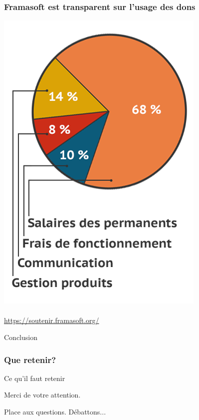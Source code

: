 \documentclass{beamer}
\begin{document}
\begin{frame}
\frametitle{Framasoft est transparent sur l'usage des dons}

\begin{center}
\includegraphics[scale=0.3]{./images/graphique.png}
\\~\\
\url{https://soutenir.framasoft.org/}
\end{center}
\end{frame}

\begin{frame}
\Huge{\centerline{Conclusion}}
\end{frame}

\begin{frame}
\frametitle{Que retenir?}

\begin{block}{Ce qu'il faut retenir}
\end{block}
\end{frame}



\begin{frame}
\Huge{\centerline{Merci de votre attention.}}
\Huge{\centerline{Place aux questions. Débattons...}}
\end{frame}
\end{document}
